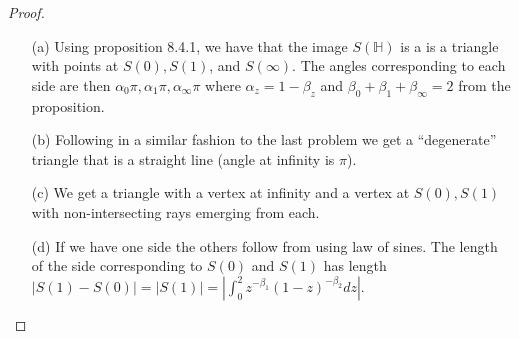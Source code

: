 \documentclass[10pt]{article}
\newcommand{\sk}{\vskip 10mm}
\newcommand{\bb}[1]{\mathbb{#1}}
\theoremstyle{remark}
\theoremstyle{remark}
\begin{document}
\begin{proof}
  \begin{enumerate}
  \item[(a)] Using proposition 8.4.1, we have that the image $S(\bb{H})$ is a
    is a triangle with points at $S(0),S(1)$, and $S(\infty)$. The angles corresponding
    to each side are then $\alpha_0\pi,\alpha_1\pi,\alpha_\infty\pi$ where $\alpha_z=1-\beta_z$ and $\beta_0+\beta_1+\beta_\infty=2$ from
    the proposition.
  \item[(b)] Following in a similar fashion to the last problem we
    get a ``degenerate'' triangle that is a straight line (angle at infinity is $\pi$).
  \item[(c)] We get a triangle with a vertex at infinity and a vertex at $S(0),S(1)$ with
    non-intersecting rays emerging from each.
  \item[(d)] If we have one side the others follow from using law of sines. The length
    of the side corresponding to $S(0)$ and $S(1)$ has length $|S(1)-S(0)|=|S(1)|=|\int_0^2 z^{-\beta_1}(1-z)^{-\beta_2}dz|$.
  \end{enumerate}
\end{proof}

\sk
\end{document}
